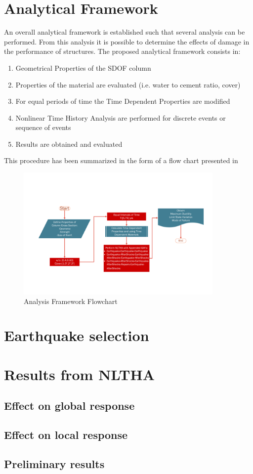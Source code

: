 \section{Analytical Framework}

An overall analytical framework is established such that several analysis can be performed. From this analysis it is possible to determine the effects of damage in the performance of structures. The proposed analytical framework consists in:

\begin{enumerate}
	\item Geometrical Properties of the SDOF column 
	\item Properties of the material are evaluated (i.e. water to cement ratio, cover)
	\item For equal periods of time the Time Dependent Properties are modified
	\item Nonlinear Time History Analysis are performed for discrete events or sequence of events
	\item Results are obtained and evaluated
\end{enumerate}

This procedure has been summarized in the form of a flow chart presented in 

\begin{figure}[htbp]
	\centering
	\includegraphics[width=0.9\textwidth]{Chapter-5/figs/AnalysisFramework_01}
	\caption{Analysis Framework Flowchart}
	\label{fig:NLTHA_Framework}
\end{figure}

\section{Earthquake selection}
\lipsum[4]
\section{Results from NLTHA}
\lipsum[5]
\subsection{Effect on global response}
\lipsum[6]
\subsection{Effect on local response}
\lipsum[7]
\subsection{Preliminary results}
\lipsum[8]
